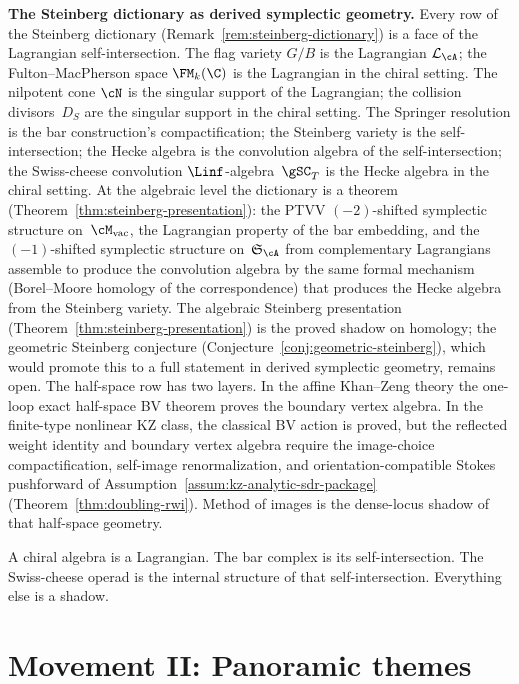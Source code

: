 \noindent\textbf{The Steinberg dictionary as derived symplectic
geometry.}\enspace
Every row of the Steinberg dictionary
(Remark~\ref{rem:steinberg-dictionary}) is a face of the Lagrangian
self-intersection. The flag variety $G/B$ is the Lagrangian
$\cL_\cA$; the Fulton--MacPherson space $\FM_k(\C)$ is the
Lagrangian in the chiral setting. The nilpotent cone $\cN$ is the
singular support of the Lagrangian; the collision
divisors~$D_S$ are the singular support in the chiral setting.
The Springer resolution is the bar construction's
compactification; the Steinberg variety is the self-intersection; the
Hecke algebra is the convolution algebra of the self-intersection;
the Swiss-cheese convolution $\Linf$-algebra~$\gSC_T$ is the Hecke
algebra in the chiral setting. At the algebraic level the dictionary is a theorem
(Theorem~\ref{thm:steinberg-presentation}): the PTVV
$(-2)$-shifted symplectic structure on~$\Mvac$, the Lagrangian
property of the bar embedding, and the $(-1)$-shifted symplectic
structure on~$\mathfrak{S}_\cA$ from complementary Lagrangians
assemble to produce the convolution algebra by the same formal
mechanism (Borel--Moore homology of the correspondence) that
produces the Hecke algebra from the Steinberg variety. The algebraic
Steinberg presentation
(Theorem~\ref{thm:steinberg-presentation}) is the proved shadow on
homology; the geometric Steinberg conjecture
(Conjecture~\ref{conj:geometric-steinberg}), which would promote this to a full statement
in derived symplectic geometry, remains open. The half-space row has
two layers. In the affine Khan--Zeng theory the one-loop exact
half-space BV theorem proves the boundary vertex algebra. In the
finite-type nonlinear KZ class, the classical BV action is proved, but
the reflected weight identity and boundary vertex algebra require the
image-choice compactification, self-image renormalization, and
orientation-compatible Stokes pushforward of
Assumption~\ref{assum:kz-analytic-sdr-package}
(Theorem~\ref{thm:doubling-rwi}). Method of images is the dense-locus
shadow of that half-space geometry.

\medskip

A chiral algebra is a Lagrangian. The bar complex is its
self-intersection. The Swiss-cheese operad is the internal structure
of that self-intersection. Everything else is a shadow.

\section*{Movement II\@: Panoramic themes}

